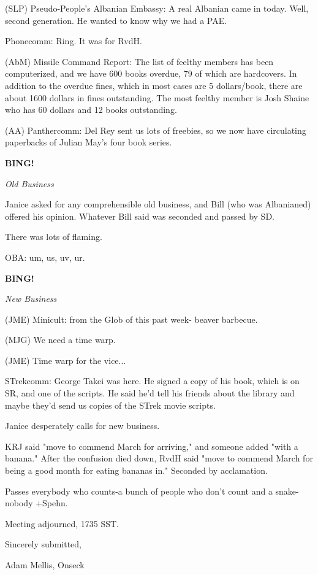 \documentclass[12pt]{article}
\newcommand{\bing}{{\bf BING!} }
\newcommand{\goto}[1]{\bing \vskip 12pt \centerline{{\em{#1}}}}
\begin{document}
(SLP) Pseudo-People's Albanian Embassy: A real Albanian came in today. Well, second generation. He wanted to know why we had a PAE.

Phonecomm: Ring. It was for RvdH.

(AbM) Missile Command Report: The list of feelthy members has been computerized, and we have 600 books overdue, 79 of which are hardcovers. In addition to the overdue fines, which in most cases are 5 dollars/book, there are about 1600 dollars in fines outstanding. The most feelthy member is Josh Shaine who has 60 dollars and 12 books outstanding.

(AA) Panthercomm: Del Rey sent us lots of freebies, so we now have circulating paperbacks of Julian May's four book series.

\goto{Old Business}

Janice asked for any comprehensible old business, and Bill (who was Albanianed) offered his opinion. Whatever Bill said was seconded and passed by SD.

There was lots of flaming.

OBA: um, us, uv, ur.

\goto{New Business}

(JME) Minicult: from the Glob of this past week- beaver barbecue.

(MJG) We need a time warp.

(JME) Time warp for the vice...

STrekcomm: George Takei was here. He signed a copy of his book, which is on SR, and one of the scripts. He said he'd tell his friends about the library and maybe they'd send us copies of the STrek movie scripts.

Janice desperately calls for new business.

KRJ said "move to commend March for arriving," and someone added "with a banana." After the confusion died down, RvdH said "move to commend March for being a good month for eating bananas in." Seconded by acclamation.

Passes everybody who counts-a bunch of people who don't count and a snake-nobody +Spehn.

\vspace{12pt}

\noindent
Meeting adjourned, 1735 SST.

\vspace{18pt}

\centerline{Sincerely submitted,}
\centerline{Adam Mellis, Onseck}
\end{document}
